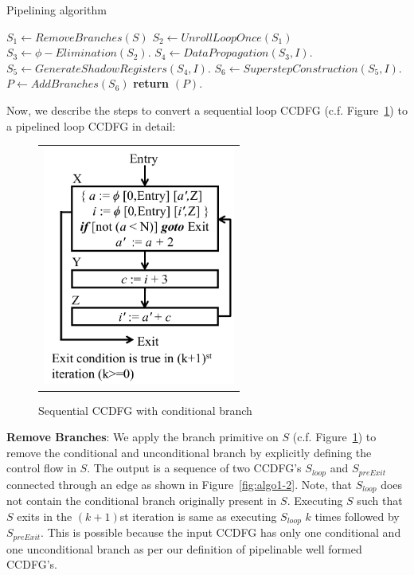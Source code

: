 \begin{algorithm}[H]
\caption{Pipelining algorithm}
\label{algo:loop}
\begin{algorithmic}[1]
\State $S_1 \leftarrow RemoveBranches(S)$
\State $S_2 \leftarrow UnrollLoopOnce(S_1)$
\State $S_3 \leftarrow \phi-Elimination (S_2) $.
\State $S_4 \leftarrow DataPropagation (S_3, I) $.
\State $S_5 \leftarrow GenerateShadowRegisters (S_4, I) $.
\State $ S_6 \leftarrow SuperstepConstruction (S_5, I) $.
\State $P \leftarrow AddBranches (S_6) $
\State \textbf{return} $(P)$.
\EndProcedure
\end{algorithmic}
\end{algorithm}

Now, we describe the steps to convert a sequential loop CCDFG (c.f. Figure~\ref{fig:algo1-1}) to a pipelined loop CCDFG in detail:

\begin{figure}[H]
\begin{center}
\begin{tabular}{c}
\includegraphics[height=3.1in]{fig-proposal/seq-ccdfg}
\end{tabular}
\end{center}
\caption{Sequential CCDFG with conditional branch}
\label{fig:algo1-1}
\end{figure}
 
{\bf Remove Branches}: We apply the branch primitive on $S$ (c.f. Figure~\ref{fig:algo1-1}) to remove the conditional and unconditional branch by explicitly defining the control flow in $S$. The output is a sequence of two CCDFG's $S_{loop}$ and $S_{preExit}$ connected through an edge as shown in Figure~\ref{fig:algo1-2}.
Note, that $S_{loop}$ does not contain the conditional branch originally present in $S$.
Executing $S$ such that $S$ exits in the $(k+1)$st iteration is same as executing $S_{loop}$ $k$ times
followed by $S_{preExit}$. This is possible because the input CCDFG has only one conditional and one unconditional branch as per our definition of pipelinable well formed CCDFG's.



